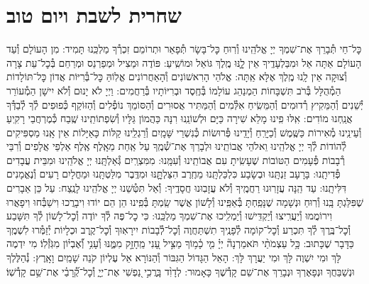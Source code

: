 \documentclass[twoside, openany, parskip=half, 11pt]{book}
\begin{document}
\chapter[שחרית לשבת ויום טוב]{ שחרית לשבת ויום טוב }




\label{nishmas}
כׇּל־חַי תְּ֯בָרֵךְ אֶת־שִׁמְךָ יְיָ אֱלֹהֵֽינוּ וְ֯רֽוּחַ כׇּל־בָּשָׂר תְּ֯פָאֵר וּתְרוֹמֵם זִכְרְ֯ךָ מַלְכֵּֽנוּ תָּמִיד: מִן הָעוֹלָם וְ֯עַד הָעוֹלָם אַתָּה אֵל וּמִבַּלְעָדֶֽיךָ אֵין לׇׇֽנּוּ מֶֽלֶךְ גּוֹאֵל וּמוֹשִֽׁיעַ:
פּוֹדֶה וּמַצִיל וּמְפַרְנֵס וּמְרַחֵם בְּ֯כׇל־עֵת צָרָה וְ֯צוּקָה אֵין לָֽנוּ מֶֽלֶךְ אֶלָּא אַֽתָּה: אֱלֹהֵי הָרִאשׁוֹנִים וְ֯הָאַחֲרוֹנִים אֱלֽוֹהַּ כׇּל־בְּ֯רִיּוֹת אֲדוֹן כׇּל־תּוֹלָדוֹת הַמְ֯הֻלָּל בְּ֯רֹב תִּשְׁבָּחוֹת הַמְנַהֵג עוֹלָמוֹ בְּ֯חֶֽסֶד וּבְרִיּוֹתָיו בְּ֯רַחֲמִים: וַיְיָ לֹא יָנוּם וְ֯לֹא יִישָׁן הַמְ֯עוֹרֵר יְ֯שֵׁנִים וְ֯הַמֵּקִיץ רְ֯דוּמִים וְ֯הַמֵּשִֽׂיחַ אִלְּ֯מִים וְ֯הַמַּתִּיר אֲסוּרִים וְ֯הַסּוֹמֵךְ נוֹפְ֯לִים וְ֯הַזּוֹקֵף כְּ֯פוּפִים לְ֯ךָ לְ֯בַדְּ֯ךָ אֲנַֽחְנוּ מוֹדִים: אִֽלּוּ פִֽינוּ מָלֵא שִׁירָה כַּיָּם וּלְשׁוֹנֵֽנוּ רִנָּה כַּהֲמוֹן גַּלָּיו וְ֯שִׂפְתוֹתֵֽינוּ שֶֽׁבַח כְּ֯מֶרְחֲבֵי רָקִֽיעַ וְ֯עֵינֵֽינוּ מְ֯אִירוֹת כַּשֶּֽׁמֶשׁ וְ֯כַיָּרֵֽחַ וְ֯יָדֵֽינוּ פְּ֯רוּשׂוֹת כְּ֯נִשְׁרֵי שָּׁמָֽיִם וְ֯רַגְלֵֽינוּ קַלּוֹת כָּאַיָּלוֹת אֵין אָֽנוּ מַסְפִּיקִים לְ֯הוֹדוֹת לְ֯ךָ יְיָ אֱלֹהֵֽינוּ וֵאלֹהֵי אֲבוֹתֵֽינוּ וּלְבָרֵךְ אֶת־שְׁ֯מֶֽךָ עַל אַֽחַת מֵאָֽלֶף אֶֽלֶף אַלְפֵי אֲלָפִים וְ֯רִבֵּי רְ֯בָבוֹת פְּ֯עָמִים הַטּוֹבוֹת שֶׁעָשִֽׂיתָ עִם אֲבוֹתֵֽינוּ וְ֯עִמָּֽנוּ: מִמִּצְרַֽיִם גְּ֯אַלְתָּֽנוּ יְיָ אֱלֹהֵֽינוּ וּמִבֵּית עֲבָדִים פְּ֯דִיתָֽנוּ: בָּרָעָב זַנְתָּֽנוּ וּבְשָׂבָע כִּלְכַּלְתָּֽנוּ מֵחֶֽרֶב הִצַּלְתׇׇּֽנּוּ וּמִדֶּֽבֶר מִלַּטְתָּֽנוּ וּמֵחֳלָיִם רָעִים וְ֯נֶאֱמָנִים דִּלִּיתָֽנוּ: עַד הֵֽנָּה עֲזָרֽוּנוּ רַחֲמֶֽיךָ וְ֯לֹא עֲזָבֽוּנוּ חֲסָדֶֽיךָ: וְ֯אַל תִּטְּ֯שֵׁנוּ יְיָ אֱלֹהֵֽינוּ לָנֶֽצַח: עַל כֵּן אֵבָרִים שֶׁפִּלַּגְתָּ בָּֽנוּ וְ֯רֽוּחַ וּנְשָׁמָה שֶׁנָּפַֽחְתָּ בְּ֯אַפֵּֽינוּ וְ֯לָשׁוֹן אֲשֶׁר שַֽׂמְתָּ בְּ֯פִֽינוּ הֵן הֵם יוֹדוּ וִיבָרֲכוּ וִישַׁבְּ֯חוּ וִיפָאֲרוּ וִירוֹמֲמוּ וְ֯יַעֲרִֽיצוּ וְ֯יַקְדִּֽישׁוּ וְ֯יַמְלִֽיכוּ אֶת־שִׁמְךָ מַלְכֵּֽנוּ: כִּי כׇל־פֶּה לְ֯ךָ יוֹדֶה וְ֯כׇל־לָשׁוֹן לְ֯ךָ תִּשָּׁבַע וְ֯כׇל־בֶּֽרֶךְ לְ֯ךָ תִּכְרַע וְ֯כׇל־קוֹמָה לְ֯פָנֶֽיךָ תִשְׁתַּחֲוֶה וְ֯כׇל־לְ֯בָבוֹת יִירָאֽוּךָ וְ֯כׇל־קֶֽרֶב וּכְלָיוֹת יְ֯זַמְּ֯רוּ לִשְׁמֶֽךָ כַּדָּבָר שֶׁכָּתוּב:
כָּ֥ל עַצְמֹתַ֨י תֹּאמַרְנָה֘ יְיָ֗ מִ֤י כָ֫מ֥וֹךָ מַצִּ֣יל עָ֭נִי מֵֽחָזָ֣ק מִמֶּ֑נּוּ וְ֯עָנִ֥י וְ֝֯אֶבְי֗וֹן מִגֹּֽזְ֯לֽוֹ׃ מִי יִדְמֶה לָּךְ וּמִי יִשְׁוֶה לָּךְ וּמִי יַעֲרָךְ לָּךְ: הָאֵל הַגָּדוֹל הַגִּבּוֹר וְ֯הַנּוֹרָא אֵל עֶלְיוֹן קֹנֵה שָׁמַֽיִם וָאָֽרֶץ:
נְ֯הַלֶּלְךָ וּנְשַׁבֵּחֲךָ וּנְפָאֶרְךָ וּנְבָרֵךְ אֶת־שֵׁם קָדְ֯שֶׁךָ כָּאָמוּר:
לְדָוִ֨ד בָּֽרֲכִ֣י נַ֭פְשִׁי אֶת־יְיָ֑ וְ֯כׇל־קְ֝֯רָבַ֗י אֶת־שֵׁ֥ם קָדְ֯שֽׁוֹ׃
\end{document}

